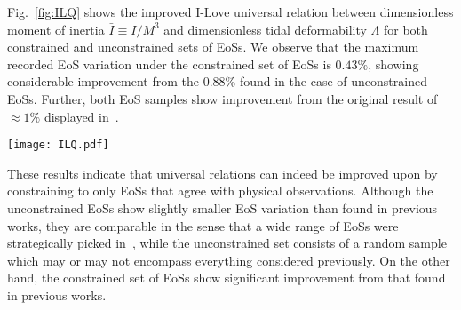 \documentclass[prd,twocolumn,nofootinbib,superscriptaddress,amsmath,amssymb]{revtex4-1}
\begin{document}
Fig.~\ref{fig:ILQ} shows the improved I-Love universal relation between dimensionless moment of inertia $\bar{I} \equiv I/M^3$ and dimensionless tidal deformability $\Lambda$ for both constrained and unconstrained sets of EoSs.
We observe that the maximum recorded EoS variation under the constrained set of EoSs is $0.43\%$, showing considerable improvement from the $0.88\%$ found in the case of unconstrained EoSs.
Further, both EoS samples show improvement from the original result of $\approx 1\%$ displayed in~\cite{Yagi:ILQ}.
\begin{figure*}
\begin{center} 
\texttt{[image: ILQ.pdf]}
\end{center}
\caption{
I-Love universal relations shown for the constrained EoSs (left) and unconstrained EoSs (right).
In this figure, the black line corresponds to the fit given by Eq.~\ref{eq:ILQfit}, while all other colors correspond to the 35 EoSs used in each case.
The maximal EoS variation from the fit for unconstrained EoSs is $0.88\%$, which is comparable to the $1\%$ found in~\cite{Yagi:ILQ}.
The constrained EoSs on the other hand, are universal to $0.43\%$, showing considerable improvement upon previous analyses.
}
\label{fig:ILQ}
\end{figure*} 

These results indicate that universal relations can indeed be improved upon by constraining to only EoSs that agree with physical observations.
Although the unconstrained EoSs show slightly smaller EoS variation than found in previous works, they are comparable in the sense that a wide range of EoSs were strategically picked in~\cite{Yagi:ILQ}, while the unconstrained set consists of a random sample which may or may not encompass everything considered previously.
On the other hand, the constrained set of EoSs show significant improvement from that found in previous 
works.
\end{document}
